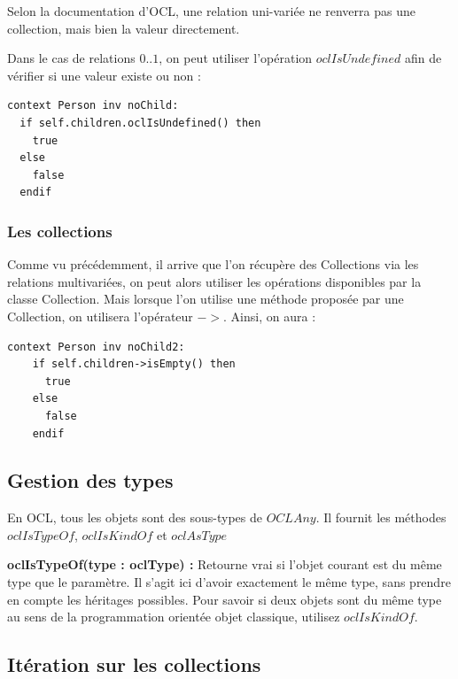 \documentclass[../Syllabus.tex]{subfiles}
\begin{document}
\vspace{0.5cm}

\begin{warningblock}
  Selon la documentation d'OCL, une relation uni-variée ne renverra pas une collection, mais bien la valeur directement.
\end{warningblock}

Dans le cas de relations $0 .. 1$, on peut utiliser l'opération $oclIsUndefined$ afin de vérifier si une valeur existe ou non : 

\begin{lstlisting}[language=OCL]
  context Person inv noChild:
  if self.children.oclIsUndefined() then
    true
  else
    false
  endif
\end{lstlisting}

\subsubsection{Les collections}

Comme vu précédemment, il arrive que l'on récupère des Collections via les relations multivariées, on peut alors utiliser les opérations disponibles par la classe Collection. Mais lorsque l'on utilise une méthode proposée par une Collection, on utilisera l'opérateur $->$. Ainsi, on aura :

\begin{lstlisting}[language=OCL]
  context Person inv noChild2:
    if self.children->isEmpty() then
      true
    else
      false
    endif
\end{lstlisting}

\subsection{Gestion des types}

En OCL, tous les objets sont des sous-types de $OCLAny$. Il fournit les méthodes $oclIsTypeOf$, $oclIsKindOf$ et $oclAsType$

\vspace{0.3cm}

\noindent\textbf{oclIsTypeOf(type : oclType) :} Retourne vrai si l'objet courant est du même type que le paramètre. Il s'agit ici d'avoir exactement le même type, sans prendre en compte les héritages possibles. Pour savoir si deux objets sont du même type au sens de la programmation orientée objet classique, utilisez $oclIsKindOf$.

\subsection{Itération sur les collections}
\end{document}
